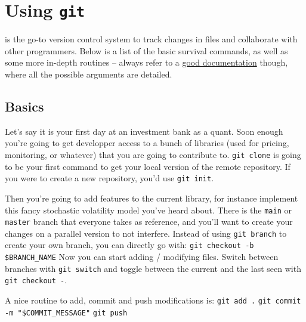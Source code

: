 \section{Using \texttt{git}}

\begin{tcolorbox}[width=\linewidth, sharp corners=all, colback=white!95!black]
     is the go-to version control system to track changes in files and collaborate with other programmers.
    Below is a list of the basic survival commands, as well as some more in-depth routines -- always refer to a \href{https://git-scm.com/docs}{good documentation} though, where all the possible arguments are detailed.
\end{tcolorbox}

\subsection*{Basics}

Let's say it is your first day at an investment bank as a quant. Soon enough you're going to get developper access to a bunch of libraries (used for pricing, monitoring, or whatever) that you are going to contribute to.\newline
\texttt{git clone}\newline
is going to be your first command to get your local version of the remote repository. If you were to create a new repository, you'd use \texttt{git init}.

Then you're going to add features to the current library, for instance implement this fancy stochastic volatility model you've heard about. There is the \texttt{main} or \texttt{master} branch that everyone takes as reference, and you'll want to create your changes on a parallel version to not interfere. Instead of using \texttt{git branch} to create your own branch, you can directly go with:\newline
\texttt{git checkout -b \$BRANCH_NAME}\newline
Now you can start adding / modifying files. Switch between branches with \texttt{git switch} and toggle between the current and the last seen with \texttt{git checkout -}.

A nice routine to add, commit and push modifications is:\newline
\texttt{git add .}\newline
\texttt{git commit -m "\$COMMIT_MESSAGE"}\newline
\texttt{git push}

